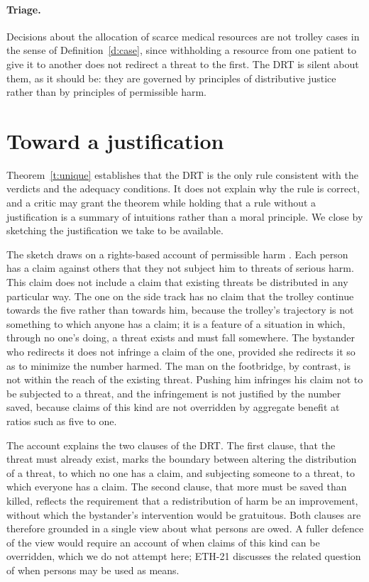 \documentclass{situationist-preprint}
\begin{document}
\paragraph{Triage.} Decisions about the allocation of scarce medical resources are not trolley cases in the sense of Definition~\ref{d:case}, since withholding a resource from one patient to give it to another does not redirect a threat to the first. The DRT is silent about them, as it should be: they are governed by principles of distributive justice rather than by principles of permissible harm.

\section{Toward a justification}

Theorem~\ref{t:unique} establishes that the DRT is the only rule consistent with the verdicts and the adequacy conditions. It does not explain why the rule is correct, and a critic may grant the theorem while holding that a rule without a justification is a summary of intuitions rather than a moral principle. We close by sketching the justification we take to be available.

The sketch draws on a rights-based account of permissible harm \citep{Thomson1990,Quinn1989}. Each person has a claim against others that they not subject him to threats of serious harm. This claim does not include a claim that existing threats be distributed in any particular way. The one on the side track has no claim that the trolley continue towards the five rather than towards him, because the trolley's trajectory is not something to which anyone has a claim; it is a feature of a situation in which, through no one's doing, a threat exists and must fall somewhere. The bystander who redirects it does not infringe a claim of the one, provided she redirects it so as to minimize the number harmed. The man on the footbridge, by contrast, is not within the reach of the existing threat. Pushing him infringes his claim not to be subjected to a threat, and the infringement is not justified by the number saved, because claims of this kind are not overridden by aggregate benefit at ratios such as five to one.

The account explains the two clauses of the DRT. The first clause, that the threat must already exist, marks the boundary between altering the distribution of a threat, to which no one has a claim, and subjecting someone to a threat, to which everyone has a claim. The second clause, that more must be saved than killed, reflects the requirement that a redistribution of harm be an improvement, without which the bystander's intervention would be gratuitous. Both clauses are therefore grounded in a single view about what persons are owed. A fuller defence of the view would require an account of when claims of this kind can be overridden, which we do not attempt here; ETH-21 discusses the related question of when persons may be used as means.
\end{document}

